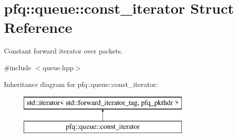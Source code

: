 \hypertarget{structpfq_1_1queue_1_1const__iterator}{\section{pfq\+:\+:queue\+:\+:const\+\_\+iterator Struct Reference}
\label{structpfq_1_1queue_1_1const__iterator}
}


Constant forward iterator over packets.  




{\ttfamily \#include $<$queue.\+hpp$>$}

Inheritance diagram for pfq\+:\+:queue\+:\+:const\+\_\+iterator\+:\begin{figure}[H]
\begin{center}
\leavevmode
\includegraphics[height=2.000000cm]{structpfq_1_1queue_1_1const__iterator}
\end{center}
\end{figure}
